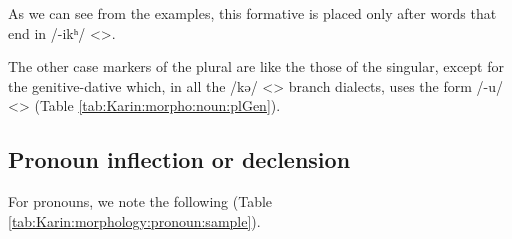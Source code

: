 As we can see from the examples, this formative is placed only after words that end in /-ikʰ/ <>. 

The other case markers of the plural are like the those of the singular, except for the genitive-dative which, in all the /kə/ <> branch dialects, uses the form /-u/ <> (Table \ref{tab:Karin:morpho:noun:plGen}). 


\begin{table}[H]
	\centering
	\caption{Genitive-dative of the plural in the Karin dialect}
	\label{tab:Karin:morpho:noun:plGen}
\end{table}



\begin{adjarianpage}\label{page:109}\end{adjarianpage}%

\subsection{Pronoun inflection or declension}

For pronouns, we note the following (Table \ref{tab:Karin:morphology:pronoun:sample}). 

